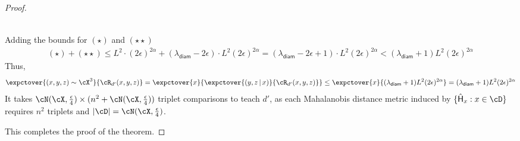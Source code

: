 \begin{proof}
\begin{center}
\begin{align*}
\end{align*}
\end{center}
Adding the bounds for $(\star)$ and $(\star\star)$
\begin{align}
    (\star) + (\star \star) \le L^2\cdot (2\epsilon)^{2\alpha} + (\lambda_{\textsf{diam}} - 2\epsilon)\cdot L^2(2\epsilon)^{2\alpha} = (\lambda_{\textsf{diam}} - 2\epsilon + 1)\cdot L^2(2\epsilon)^{2\alpha} < (\lambda_{\textsf{diam}} + 1)L^2(2\epsilon)^{2\alpha}
\end{align}
Thus,
\begin{align*}
    \expctover{(x,y,z) \sim \cX^3}{\cR_{d'}(x,y,z)} = \expctover{x}{\expctover{(y,z\,|\,x)}{\cR_{d'}(x,y,z)}} \le \expctover{x}{ (\lambda_{\textsf{diam}} + 1)L^2(2\epsilon)^{2\alpha}} =  (\lambda_{\textsf{diam}} + 1)L^2(2\epsilon)^{2\alpha}
\end{align*}
It takes $\cN(\cX, \frac{\epsilon}{4})\times (n^2 + \cN(\cX, \frac{\epsilon}{4}))$ triplet comparisons to teach $d'$, as each Mahalanobis distance metric induced by $\{\hat{\sf{H}}_x: x \in \cD\}$ requires $n^2$ triplets and $|\cD| = \cN(\cX, \frac{\epsilon}{4})$.

This completes the proof of the theorem.
\end{proof}



\newpage


